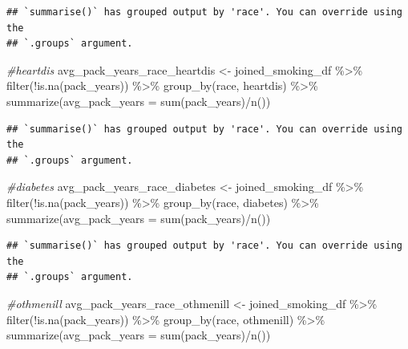 \documentclass[
]{article}
\newenvironment{Shaded}{\begin{snugshade}}{\end{snugshade}}
\newcommand{\AttributeTok}[1]{\textcolor[rgb]{0.77,0.63,0.00}{#1}}
\newcommand{\CommentTok}[1]{\textcolor[rgb]{0.56,0.35,0.01}{\textit{#1}}}
\newcommand{\FunctionTok}[1]{\textcolor[rgb]{0.00,0.00,0.00}{#1}}
\newcommand{\NormalTok}[1]{#1}
\newcommand{\OtherTok}[1]{\textcolor[rgb]{0.56,0.35,0.01}{#1}}
\newcommand{\SpecialCharTok}[1]{\textcolor[rgb]{0.00,0.00,0.00}{#1}}
\begin{document}
\begin{verbatim}
## `summarise()` has grouped output by 'race'. You can override using the
## `.groups` argument.
\end{verbatim}

\begin{Shaded}
\begin{Highlighting}[]
\CommentTok{\#heartdis}
\NormalTok{avg\_pack\_years\_race\_heartdis }\OtherTok{\textless{}{-}}\NormalTok{ joined\_smoking\_df }\SpecialCharTok{\%\textgreater{}\%}
  \FunctionTok{filter}\NormalTok{(}\SpecialCharTok{!}\FunctionTok{is.na}\NormalTok{(pack\_years)) }\SpecialCharTok{\%\textgreater{}\%}
  \FunctionTok{group\_by}\NormalTok{(race, heartdis) }\SpecialCharTok{\%\textgreater{}\%}
  \FunctionTok{summarize}\NormalTok{(}\AttributeTok{avg\_pack\_years =} \FunctionTok{sum}\NormalTok{(pack\_years)}\SpecialCharTok{/}\FunctionTok{n}\NormalTok{())}
\end{Highlighting}
\end{Shaded}

\begin{verbatim}
## `summarise()` has grouped output by 'race'. You can override using the
## `.groups` argument.
\end{verbatim}

\begin{Shaded}
\begin{Highlighting}[]
\CommentTok{\#diabetes}
\NormalTok{avg\_pack\_years\_race\_diabetes }\OtherTok{\textless{}{-}}\NormalTok{ joined\_smoking\_df }\SpecialCharTok{\%\textgreater{}\%}
  \FunctionTok{filter}\NormalTok{(}\SpecialCharTok{!}\FunctionTok{is.na}\NormalTok{(pack\_years)) }\SpecialCharTok{\%\textgreater{}\%}
  \FunctionTok{group\_by}\NormalTok{(race, diabetes) }\SpecialCharTok{\%\textgreater{}\%}
  \FunctionTok{summarize}\NormalTok{(}\AttributeTok{avg\_pack\_years =} \FunctionTok{sum}\NormalTok{(pack\_years)}\SpecialCharTok{/}\FunctionTok{n}\NormalTok{())}
\end{Highlighting}
\end{Shaded}

\begin{verbatim}
## `summarise()` has grouped output by 'race'. You can override using the
## `.groups` argument.
\end{verbatim}

\begin{Shaded}
\begin{Highlighting}[]
\CommentTok{\#othmenill}
\NormalTok{avg\_pack\_years\_race\_othmenill }\OtherTok{\textless{}{-}}\NormalTok{ joined\_smoking\_df }\SpecialCharTok{\%\textgreater{}\%}
  \FunctionTok{filter}\NormalTok{(}\SpecialCharTok{!}\FunctionTok{is.na}\NormalTok{(pack\_years)) }\SpecialCharTok{\%\textgreater{}\%}
  \FunctionTok{group\_by}\NormalTok{(race, othmenill) }\SpecialCharTok{\%\textgreater{}\%}
  \FunctionTok{summarize}\NormalTok{(}\AttributeTok{avg\_pack\_years =} \FunctionTok{sum}\NormalTok{(pack\_years)}\SpecialCharTok{/}\FunctionTok{n}\NormalTok{())}
\end{Highlighting}
\end{Shaded}
\end{document}
